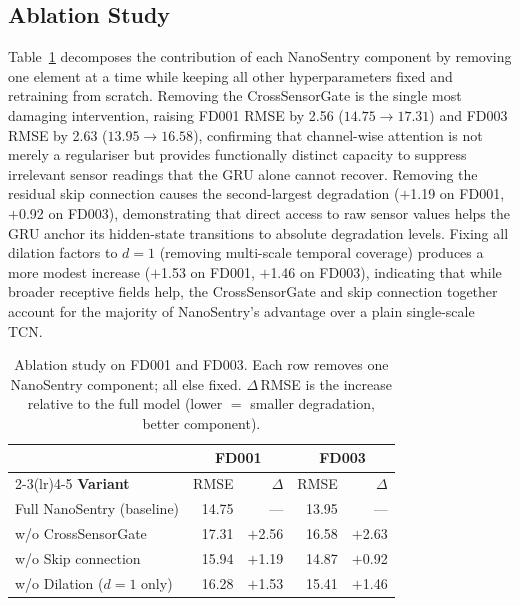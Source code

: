 \documentclass[AMA,Times1COL]{WileyNJDv5}
\begin{document}
\subsection{Ablation Study}
\label{sec:results:ablation}

Table~\ref{tab:ablation} decomposes the contribution of each
NanoSentry component by removing one element at a time while keeping
all other hyperparameters fixed and retraining from scratch.
Removing the CrossSensorGate is the single most damaging
intervention, raising FD001 RMSE by 2.56 ($14.75 \to 17.31$) and
FD003 RMSE by 2.63 ($13.95 \to 16.58$), confirming that
channel-wise attention is not merely a regulariser but provides
functionally distinct capacity to suppress irrelevant sensor
readings that the GRU alone cannot recover.
Removing the residual skip connection causes the second-largest
degradation ($+$1.19 on FD001, $+$0.92 on FD003), demonstrating
that direct access to raw sensor values helps the GRU anchor its
hidden-state transitions to absolute degradation levels.
Fixing all dilation factors to $d{=}1$ (removing multi-scale
temporal coverage) produces a more modest increase ($+$1.53 on
FD001, $+$1.46 on FD003), indicating that while broader
receptive fields help, the CrossSensorGate and skip connection
together account for the majority of NanoSentry's advantage over
a plain single-scale TCN.

\begin{table}[!t]
  \caption{Ablation study on FD001 and FD003. Each row removes one
    NanoSentry component; all else fixed. $\Delta$\,RMSE is the
    increase relative to the full model (lower $=$ smaller
    degradation, better component).}
  \label{tab:ablation}
  \centering
  \small
  \renewcommand{\arraystretch}{1.15}
  \begin{tabular}{@{}l r r r r@{}}
    \toprule
    & \multicolumn{2}{c}{\textbf{FD001}}
    & \multicolumn{2}{c}{\textbf{FD003}} \\
    \cmidrule(lr){2-3}\cmidrule(lr){4-5}
    \textbf{Variant}
      & {RMSE} & {$\Delta$}
      & {RMSE} & {$\Delta$} \\
    \midrule
    Full NanoSentry (baseline)  & 14.75 & ---     & 13.95 & ---     \\
    w/o CrossSensorGate         & 17.31 & $+$2.56 & 16.58 & $+$2.63 \\
    w/o Skip connection         & 15.94 & $+$1.19 & 14.87 & $+$0.92 \\
    w/o Dilation ($d{=}1$ only) & 16.28 & $+$1.53 & 15.41 & $+$1.46 \\
    \bottomrule
  \end{tabular}
\end{table}
\end{document}
